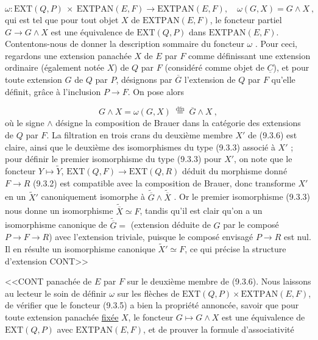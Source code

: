 \begin{equation}\tag{9.3.5}
\omega : \mathrm{EXT}(Q,P) \ \times \ \mathrm{EXTPAN}(E,F) \longrightarrow \mathrm{EXTPAN}(E,F), \quad \omega(G,X) = G \wedge X \ ,
\end{equation}
qui est tel que pour tout objet $X$ de $\mathrm{EXTPAN}(E,F)$, le foncteur partiel $G \longrightarrow G \wedge X$ est une équivalence de $\mathrm{EXT}(Q,P)$ dans $\mathrm{EXTPAN}(E,F)$. Contentons-nous de donner la description sommaire du foncteur $\omega$ . Pour ceci, regardons une extension panachée $X$ de $E$ par $F$ comme définissant une extension ordinaire (également notée $X$) de $Q$ par $F$ (considéré comme objet de $\underline{C}$), et pour toute extension $G$ de $Q$ par $P$, désignons par $\overline{G}$ l'extension de $Q$ par $F$ qu'elle définit, grâce à l'inclusion $P \longrightarrow F$. On pose alors

\begin{equation}\tag{9.3.6}
G \wedge X = \omega(G,X) \;\overset{\mathrm{dfn}}{=}\; \overline{G} \wedge X \ ,
\end{equation}
où le signe $\wedge$ désigne la composition de Brauer dans la catégorie des extensions de $Q$ par $F$. La filtration en trois crans du deuxième membre $X'$ de (9.3.6) est claire, ainsi que le deuxième des isomorphismes du type (9.3.3) associé à $X'$ ; pour définir le premier isomorphisme du type (9.3.3) pour $X'$, on note que le foncteur $Y \longmapsto \widetilde{Y}$, $\mathrm{EXT}(Q,F) \longrightarrow \mathrm{EXT}(Q,R)$ déduit du morphisme donné $F \longrightarrow R$ (9.3.2) est compatible avec la composition de Brauer, donc transforme $X'$ en un $\widetilde{X}'$ canoniquement isomorphe à $\widetilde{\overline{G}} \wedge \widetilde{\overline{X}}$ . Or le premier isomorphisme (9.3.3) nous donne un isomorphisme $\widetilde{\overline{X}} \simeq F$, tandis qu'il est clair qu'on a un isomorphisme canonique de $\widetilde{\overline{G}} =$ (extension déduite de $G$ par le composé $P \longrightarrow F \longrightarrow R$) avec l'extension triviale, puisque le composé envisagé $P \longrightarrow R$ est nul. Il en résulte un isomorphisme canonique $\widetilde{X}' \simeq F$, ce qui précise la structure d'extension CONT>>



<<CONT panachée de $E$ par $F$ sur le deuxième membre de (9.3.6). Nous laissons au lecteur le soin de définir $\omega$ sur les flèches de $\mathrm{EXT}(Q,P) \times \mathrm{EXTPAN}(E,F)$, de vérifier que le foncteur (9.3.5) a bien la propriété annoncée, savoir que pour toute extension panachée \underline{fixée} $X$, le foncteur $G \longmapsto G \wedge X$ est une équivalence de $\mathrm{EXT}(Q,P)$ avec $\mathrm{EXTPAN}(E,F)$, et de prouver la formule d'associativité


